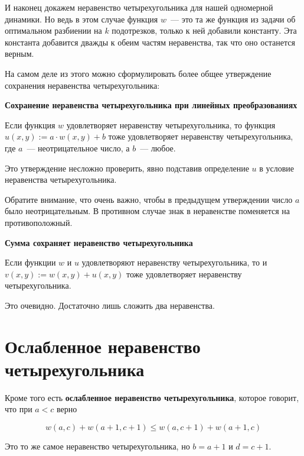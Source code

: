 \begin{example}
    И наконец докажем неравенство четырехугольника для нашей одномерной динамики. Но ведь в этом случае функция $w$~--- это та же функция из задачи об оптимальном разбиении на $k$ подотрезков, только к ней добавили константу. Эта константа добавится дважды к обеим частям неравенства, так что оно останется верным.
\end{example}

На самом деле из этого можно сформулировать более общее утверждение сохранения неравенства четырехугольника:

\begin{proposition} \textbf{Сохранение неравенства четырехугольника при линейных преобразованиях}

    Если функция $w$ удовлетворяет неравенству четырехугольника, то функция $u(x, y) := a \cdot w(x, y) + b$ тоже удовлетворяет неравенству четырехугольника, где $a$~--- неотрицательное число, а $b$~--- любое.
\end{proposition}

Это утверждение несложно проверить, явно подставив определение $u$ в условие неравенства четырехугольника.

\begin{observation}
    Обратите внимание, что очень важно, чтобы в предыдущем утверждении число $a$ было неотрицательным. В противном случае знак в неравенстве поменяется на противоположный.
\end{observation}

\begin{proposition} \textbf{Сумма сохраняет неравенство четырехугольника}
    
    Если функции $w$ и $u$ удовлетворяют неравенству четырехугольника, то и $v(x, y) := w(x, y) + u(x, y)$ тоже удовлетворяет неравенству четырехугольника.
\end{proposition}

Это очевидно. Достаточно лишь сложить два неравенства.

\section{Ослабленное неравенство четырехугольника}

Кроме того есть \textbf{ослабленное неравенство четырехугольника}, которое говорит, что при $a < c$ верно

$$w(a, c) + w(a + 1, c + 1) \le w(a, c + 1) + w(a + 1, c)$$

Это то же самое неравенство четырехугольника, но $b = a + 1$ и $d = c + 1$.

